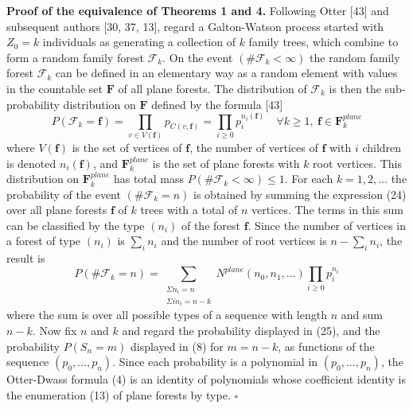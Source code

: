 \noindent\textbf{Proof of the equivalence of Theorems 1 and 4.} Following Otter [43] and subsequent authors [30, 37, 13], regard a Galton-Watson process started with $Z_0=k$ individuals as generating a collection of $k$ family trees, which combine to form a random family forest $\mathcal{F}_k$. On the event $(\#\mathcal{F}_k<\infty)$ the random family forest $\mathcal{F}_k$ can be defined in an elementary way as a random element with values in the countable set $\mathbf{F}$ of all plane forests. The distribution of $\mathcal{F}_k$ is then the sub-probability distribution on $\mathbf{F}$ defined by the formula [43]
\[
P(\mathcal{F}_k=\mathbf{f})=\prod_{v\in V(\mathbf{f})} p_{C(v,\mathbf{f})}=\prod_{i\ge 0} p_i^{n_i(\mathbf{f})} \quad \forall k\ge 1,\ \mathbf{f}\in\mathbf{F}_k^{\mathit{plane}} \tag{24}
\]
where $V(\mathbf{f})$ is the set of vertices of $\mathbf{f}$, the number of vertices of $\mathbf{f}$ with $i$ children is denoted $n_i(\mathbf{f})$, and $\mathbf{F}_k^{\mathit{plane}}$ is the set of plane forests with $k$ root vertices. This distribution on $\mathbf{F}_k^{\mathit{plane}}$ has total mass $P(\#\mathcal{F}_k<\infty)\le 1$. For each $k=1,2,\ldots$ the probability of the event $(\#\mathcal{F}_k=n)$ is obtained by summing the expression (24) over all plane forests $\mathbf{f}$ of $k$ trees with a total of $n$ vertices. The terms in this sum can be classified by the type $(n_i)$ of the forest $\mathbf{f}$. Since the number of vertices in a forest of type $(n_i)$ is $\sum_i n_i$ and the number of root vertices is $n-\sum_i n_i$, the result is
\[
P(\#\mathcal{F}_k=n)=\sum_{\substack{\Sigma n_i=n\\ \Sigma i n_i=n-k}} N^{\mathit{plane}}(n_0,n_1,\ldots)\prod_{i\ge 0} p_i^{n_i} \tag{25}
\]
where the sum is over all possible types of a sequence with length $n$ and sum $n-k$. Now fix $n$ and $k$ and regard the probability displayed in (25), and the probability $P(S_n=m)$ displayed in (8) for $m=n-k$, as functions of the sequence $(p_0,\ldots,p_n)$. Since each probability is a polynomial in $(p_0,\ldots,p_n)$, the Otter-Dwass formula (4) is an identity of polynomials whose coefficient identity is the enumeration (13) of plane forests by type. \hfill$\square$
